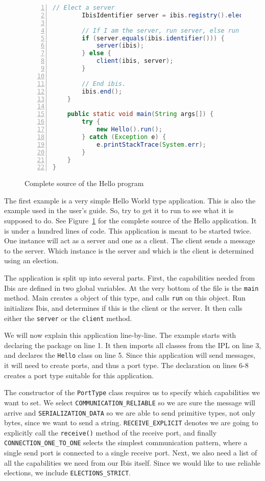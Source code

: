 \begin{figure}[p]
\begin{lstlisting}[language=Java,numbers=left, numbersep=3pt]
        // Elect a server
        IbisIdentifier server = ibis.registry().elect("Server");

        // If I am the server, run server, else run client.
        if (server.equals(ibis.identifier())) {
            server(ibis);
        } else {
            client(ibis, server);
        }

        // End ibis.
        ibis.end();
    }

    public static void main(String args[]) {
        try {
            new Hello().run();
        } catch (Exception e) {
            e.printStackTrace(System.err);
        }
    }
}
\end{lstlisting}
\caption{Complete source of the Hello program}
\label{hello_source}
\end{figure}

The first example is a very simple Hello World type application. This is
also the example used in the user's guide. So, try to get it to run to
see what it is supposed to do. See Figure~\ref{hello_source} for the
complete source of the Hello application. It is under a hundred lines of
code. This application is meant to be started twice. One instance will
act as a server and one as a client. The client sends a message to the
server. Which instance is the server and which is the client is
determined using an election.

The application is split up into several parts. First, the capabilities
needed from Ibis are defined in two global variables. At the very bottom
of the file is the \texttt{main} method. Main creates a object of this
type, and calls \texttt{run} on this object. Run initializes Ibis, and
determines if this is the client or the server. It then calls either the
\texttt{server} or the \texttt{client} method.

We will now explain this application line-by-line. The example starts
with declaring the package on line 1. It then imports all classes from
the IPL on line 3, and declares the \texttt{Hello} class on line 5. Since
this application will send messages, it will need to create ports, and
thus a port type. The declaration on lines 6-8 creates a port type
suitable for this application. 

The constructor of the \texttt{PortType} class requires us to specify
which capabilities we want to set. We select
\texttt{COMMUNICATION\_RELIABLE} so we are sure the message will arrive
and \texttt{SERIALIZATION\_DATA} so we are able to send primitive types,
not only bytes, since we want to send a string. \texttt{RECEIVE\_EXPLICIT}
denotes we are going to explicitly call the \texttt{receive()} method of
the receive port, and finally \texttt{CONNECTION\_ONE\_TO\_ONE} selects
the simplest communication pattern, where a single send port is connected
to a single receive port.
Next, we also need a list of all the capabilities we need from our Ibis
itself. Since we would like to use reliable elections, we include
\texttt{ELECTIONS\_STRICT}.

